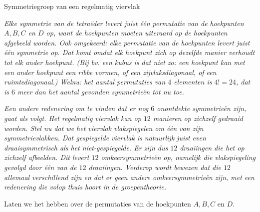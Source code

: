 \begin{lesactiviteit}{Symmetriegroep van een regelmatig viervlak}
\begin{vraagenantwoord}
	
	
	

	
	\emph{Elke symmetrie van de tetraëder levert juist één permutatie van de hoekpunten $A, B, C$ en $D$ op, want de hoekpunten moeten uiteraard op de hoekpunten afgebeeld worden. Ook omgekeerd: elke permutatie van de hoekpunten levert juist één symmetrie op. Dat komt omdat elk hoekpunt zich op dezelfde manier verhoudt tot elk ander hoekpunt. (Bij bv. een kubus is dat niet zo: een hoekpunt kan met een ander hoekpunt een ribbe vormen, of een zijvlaksdiagonaal, of een ruimtediagonaal.) Welnu: het aantal permutaties van $4$ elementen is $4!=24$, dat is $6$ meer dan het aantal gevonden symmetrieën tot nu toe.}
	
	\emph{Een andere redenering om te vinden dat er nog $6$ onontdekte symmetrieën zijn, gaat als volgt. Het regelmatig viervlak kan op $12$ manieren op zichzelf gedraaid worden. Stel nu dat we het viervlak vlakspiegelen om één van zijn symmetrievlakken. Dat gespiegelde viervlak is natuurlijk juist even draaisymmetrisch als het niet-gespiegelde. Er zijn dus $12$ draaiingen die het op zichzelf afbeelden. Dit levert $12$ omkeersymmetrieën op, namelijk die vlakspiegeling gevolgd door één van de $12$ draaiingen. Verderop wordt bewezen dat die $12$ allemaal verschillend zijn en dat er geen andere omkeersymmetrieën zijn, met een redenering die volop thuis hoort in de groepentheorie.}
	
\end{vraagenantwoord}

 Laten we het hebben over de permutaties van de hoekpunten $A, B, C$ en $D$. 
 

\end{lesactiviteit}
